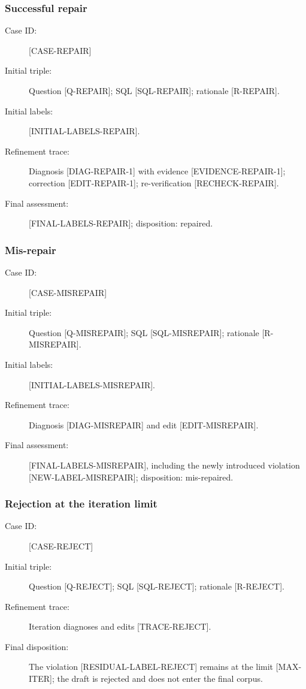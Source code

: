 \documentclass[letterpaper,journal]{IEEEtran}
\begin{document}
\subsubsection{Successful repair}
\label{app:refinement-cases:repair}

\begin{description}
\item[Case ID:] [CASE-REPAIR]
\item[Initial triple:] Question [Q-REPAIR]; SQL [SQL-REPAIR]; rationale [R-REPAIR].
\item[Initial labels:] [INITIAL-LABELS-REPAIR].
\item[Refinement trace:] Diagnosis [DIAG-REPAIR-1] with evidence [EVIDENCE-REPAIR-1]; correction [EDIT-REPAIR-1]; re-verification [RECHECK-REPAIR].
\item[Final assessment:] [FINAL-LABELS-REPAIR]; disposition: repaired.
\end{description}

\subsubsection{Mis-repair}
\label{app:refinement-cases:misrepair}

\begin{description}
\item[Case ID:] [CASE-MISREPAIR]
\item[Initial triple:] Question [Q-MISREPAIR]; SQL [SQL-MISREPAIR]; rationale [R-MISREPAIR].
\item[Initial labels:] [INITIAL-LABELS-MISREPAIR].
\item[Refinement trace:] Diagnosis [DIAG-MISREPAIR] and edit [EDIT-MISREPAIR].
\item[Final assessment:] [FINAL-LABELS-MISREPAIR], including the newly introduced violation [NEW-LABEL-MISREPAIR]; disposition: mis-repaired.
\end{description}

\subsubsection{Rejection at the iteration limit}
\label{app:refinement-cases:rejection}

\begin{description}
\item[Case ID:] [CASE-REJECT]
\item[Initial triple:] Question [Q-REJECT]; SQL [SQL-REJECT]; rationale [R-REJECT].
\item[Refinement trace:] Iteration diagnoses and edits [TRACE-REJECT].
\item[Final disposition:] The violation [RESIDUAL-LABEL-REJECT] remains at the limit [MAX-ITER]; the draft is rejected and does not enter the final corpus.
\end{description}
\end{document}
